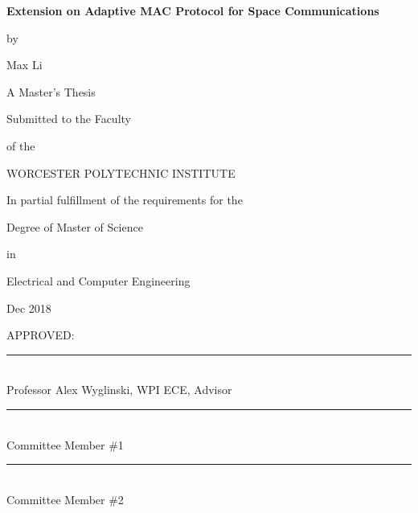 \documentclass[12pt]{report}
\begin{document}
	\newcommand{\brk}{\vspace*{0.18in}}
	
	\thispagestyle{empty}
	
	\begin{center}
		
		\brk
		
		
		{\large 
			\textbf{
				Extension on Adaptive MAC Protocol for Space Communications
			}
		}		
		
		\brk
		by
		
		\brk
		Max Li
		
		\brk
		\brk
		A Master's Thesis
		
		\brk
		Submitted to the Faculty 
		
		\brk
		of the
		
		\brk
		\brk
		WORCESTER POLYTECHNIC INSTITUTE
		
		\brk
		\brk
		In partial fulfillment of the requirements for the
		
		\brk
		Degree of Master of Science
		
		\brk
		in
		
		\brk
		Electrical and Computer Engineering
		
		\brk
		Dec 2018
	\end{center}
	
	\setlength{\parindent}{0pt}
	\brk
	\brk
	\brk
	APPROVED:\\

	\rule{3in}{0.8pt}\\
	Professor Alex Wyglinski, WPI ECE, Advisor\\

    \rule{3in}{0.8pt}\\
	Committee Member \#1\\

    \rule{3in}{0.8pt}\\
    Committee Member \#2\\
\end{document}
